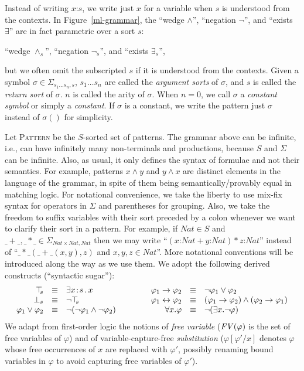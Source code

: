 \documentclass[UTF8,11pt]{article}
\theoremstyle{plain}
\theoremstyle{definition}
\theoremstyle{remark}
\newcommand{\cln}{\texttt{:}}
\newcommand{\Nat}{\textit{Nat}}
\newcommand{\Pattern}{\textsc{Pattern}\xspace}
\newcommand{\ra}{\rightarrow}
\newcommand{\lra}{\leftrightarrow}
\newcommand{\FV}{{\it FV}}
\begin{document}
Instead of writing $x \cln s$, we write just $x$ for a variable when $s$ is 
understood from the contexts.
In Figure~\ref{ml-grammar}, the ``wedge $\wedge$'', ``negation $\neg$'', and 
``exists $\exists$'' are in fact
parametric over a sort $s$:
\begin{center}
	``wedge $\wedge_s$'', ``negation $\neg_s$'', and ``exists $\exists_s$'',
\end{center}
but we often omit the subscripted $s$ if it is understood from the contexts.
Given a symbol $\sigma \in \Sigma_{s_1 \ldots s_n,s}$, $s_1 \ldots s_n$ are 
called the \emph{argument sorts} of $\sigma$, and $s$ is called the 
\emph{return sort} of $\sigma$.
$n$ is called the arity of $\sigma$.
When $n = 0$, we call $\sigma$ a \emph{constant symbol} or simply a 
\emph{constant}.
If $\sigma$ is a constant, we write the pattern just $\sigma$ instead of 
$\sigma()$ for 
simplicity.

Let \Pattern be the $S$-sorted set of patterns.
The grammar above can be infinite, i.e., can have infinitely many
non-terminals and productions, because $S$ and $\Sigma$ can be
infinite.
Also, as usual, it only defines the syntax of formulae and not
their semantics.
For example, patterns $x \wedge y$ and $y \wedge x$ are distinct elements in
the language of the grammar, in spite of them being semantically/provably
equal in matching logic.
For notational convenience, we take the liberty to use mix-fix syntax for
operators in $\Sigma$ and parentheses for grouping.
Also, we take the freedom to suffix variables with their sort preceded
by a colon whenever we want to clarify their sort in a pattern.
For example, if $\Nat \in S$ and
$\_+\_, \_*\_ \in \Sigma_{\Nat \times \Nat, \Nat}$
then we may write ``$(x\cln\Nat + y\cln\Nat)*z\cln\Nat$'' instead of
``$\_*\_(\_+\_(x,y),z)$ and $x,y,z\in\Nat$''.
More notational conventions will be introduced along the way
as we use them. 
We adopt the following derived constructs (``syntactic sugar''): %
$$\begin{array}{rcl@{\hspace*{10ex}}rcl}
\top_{\!\!s} & \equiv & \exists x\!:\!s \,.\, x &
\varphi_1 \ra \varphi_2 & \equiv & \neg\varphi_1 \vee \varphi_2 \\
\bot_{s} & \equiv & \neg \top_{\!\!s} &
\varphi_1 \lra \varphi_2 & \equiv & (\varphi_1 \ra \varphi_2) \wedge
 (\varphi_2 \ra \varphi_1) \\
\varphi_1 \vee \varphi_2 & \equiv & \neg(\neg\varphi_1\wedge\neg\varphi_2) &
\forall x . \varphi & \equiv & \neg(\exists x . \neg\varphi) \\
\end{array}
$$
We adapt from first-order logic the notions of \emph{free variable}
($\FV(\varphi)$ is the set of free variables of $\varphi$) and of
variable-capture-free \emph{substitution} ($\varphi[\varphi'/x]$ denotes
$\varphi$ whose free occurrences of $x$ are replaced with $\varphi'$, possibly
renaming bound variables in $\varphi$ to avoid capturing free variables of
$\varphi'$).
\end{document}
